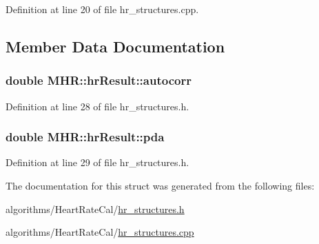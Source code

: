 Definition at line 20 of file hr\+\_\+structures.\+cpp.



\subsection{Member Data Documentation}
\hypertarget{struct_m_h_r_1_1hr_result_a369652948d5ff326dc1a822cbc0cc082}{
\subsubsection[{autocorr}]{\setlength{\rightskip}{0pt plus 5cm}double M\+H\+R\+::hr\+Result\+::autocorr}}\label{struct_m_h_r_1_1hr_result_a369652948d5ff326dc1a822cbc0cc082}


Definition at line 28 of file hr\+\_\+structures.\+h.

\hypertarget{struct_m_h_r_1_1hr_result_a7b5e354201327bd08c0ebded5c48367d}{
\subsubsection[{pda}]{\setlength{\rightskip}{0pt plus 5cm}double M\+H\+R\+::hr\+Result\+::pda}}\label{struct_m_h_r_1_1hr_result_a7b5e354201327bd08c0ebded5c48367d}


Definition at line 29 of file hr\+\_\+structures.\+h.



The documentation for this struct was generated from the following files\+:\begin{DoxyCompactItemize}
\item 
algorithms/\+Heart\+Rate\+Cal/\hyperlink{hr__structures_8h}{hr\+\_\+structures.\+h}\item 
algorithms/\+Heart\+Rate\+Cal/\hyperlink{hr__structures_8cpp}{hr\+\_\+structures.\+cpp}\end{DoxyCompactItemize}

